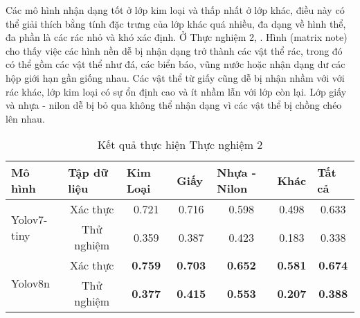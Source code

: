 \documentclass[../the.tex]{subfiles}
\begin{document}
\bigskip

{\fontsize{13}{12} \selectfont
    Các mô hình nhận dạng tốt ở lớp kim loại và thấp nhất ở lớp khác,
    điều này có thể giải thích bằng tính đặc trưng của lớp khác quá nhiều, đa dạng về hình thể, đa phần là các rác nhỏ và khó xác định.
    Ở Thực nghiệm 2, .
    Hình (matrix note) cho thấy việc các hình nền dễ bị nhận dạng trở thành các vật thể rác, trong đó có thể gồm các vật thể như đá, các biển báo, vũng nước hoặc nhận dạng dư các hộp giới hạn gần giống nhau.
    Các vật thể từ giấy cũng dễ bị nhận nhầm với với rác khác, lớp kim loại có sự ổn định cao và ít nhầm lẫn với lớp còn lại. Lớp giấy và nhựa - nilon dễ bị bỏ qua không thể nhận dạng vì các vật thể bị chồng chéo lên nhau.
}
\begin{table}[h!]
    \centering
    \caption{Kết quả thực hiện Thực nghiệm 2}
    \begin{tabular}{|l|c|c|c|c|c|c|}
        \hline
        \textbf{Mô hình}             & \multicolumn{1}{l|}{\textbf{Tập dữ liệu}} & \multicolumn{1}{l|}{\textbf{Kim Loại}} & \multicolumn{1}{l|}{\textbf{Giấy}} & \multicolumn{1}{l|}{\textbf{Nhựa - Nilon}} & \multicolumn{1}{l|}{\textbf{Khác}} & \multicolumn{1}{l|}{Tất cả} \\ \hline
        \multirow{2}{*}{Yolov7-tiny} & Xác thực                                  & 0.721                                  & 0.716                              & 0.598                                      & 0.498                              & 0.633                       \\ \cline{2-7} 
                                     & Thử nghiệm                                & 0.359                                  & 0.387                              & 0.423                                      & 0.183                              & 0.338                       \\ \hline
        \multirow{2}{*}{Yolov8n}     & Xác thực                                  & \textbf{0.759}                         & \textbf{0.703}                     & \textbf{0.652}                             & \textbf{0.581}                     & \textbf{0.674}              \\ \cline{2-7} 
                                     & Thử nghiệm                                & \textbf{0.377}                         & \textbf{0.415}                     & \textbf{0.553}                             & \textbf{0.207}                     & \textbf{0.388}              \\ \hline
        \end{tabular}
    \label{tab:thucnghiem2.1}
\end{table}
\end{document}

